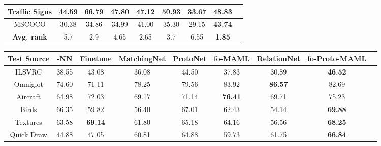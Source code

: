 \documentclass{article} \usepackage{iclr2020_conference,times}
\begin{document}
\begin{table*}[t]
\begin{tabular}{|c|c|c|c|c|c|c|c|c|}
Traffic Signs               & 44.59                & \bf{66.79}             & 47.80                     & 47.12                  & 50.93                 & 33.67                      & 48.83             \\\hline
MSCOCO                      & 30.38                & 34.86                  & 34.99                     & 41.00                  & 35.30                 & 29.15                      & \bf{43.74}        \\\hline\hline
\textbf{Avg. rank}          & 5.7 & 2.9 & 4.65 & 2.65 & 3.7 & 6.55 & \bf{1.85}\\\hline
\end{tabular}

\vspace{\baselineskip}
\begin{tabular}{|c|c|c|c|c|c|c|c|c|}
\hline
Test Source                 & -NN               & Finetune               & MatchingNet               & ProtoNet               & fo-MAML               & RelationNet                & fo-Proto-MAML \\\hline\hline
ILSVRC                      & 38.55                & 43.08                  & 36.08                     & 44.50                  & 37.83                 & 30.89                      & \bf{46.52}        \\\hline
Omniglot                    & 74.60                & 71.11                  & 78.25                     & 79.56                  & 83.92                 & \bf{86.57}                 & 82.69             \\\hline
Aircraft                    & 64.98                & 72.03                  & 69.17                     & 71.14                  & \bf{76.41}            & 69.71                      & 75.23             \\\hline
Birds                       & 66.35                & 59.82                  & 56.40                     & 67.01                  & 62.43                 & 54.14                      & \bf{69.88}        \\\hline
Textures                    & 63.58                & \bf{69.14}             & 61.80                     & 65.18                  & 64.16                 & 56.56                      & \bf{68.25}        \\\hline
Quick Draw                  & 44.88                & 47.05                  & 60.81                     & 64.88                  & 59.73                 & 61.75                      & \bf{66.84}        \\\hline

\end{tabular}
\end{table*}
\end{document}
